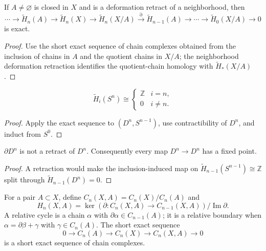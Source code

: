 \begin{theorem}
\label{thm:excision}

If $A\ne\varnothing$ is closed in $X$ and is a deformation retract of a neighborhood, then
\[
\cdots\to\widetilde H_n(A)\to\widetilde H_n(X)\to\widetilde H_n(X/A)\xrightarrow{\partial}\widetilde H_{n-1}(A)\to\cdots\to\widetilde H_0(X/A)\to0
\]
is exact.
\end{theorem}
\begin{proof}
\sketch Use the short exact sequence of chain complexes obtained from the inclusion of chains in $A$ and the quotient chains in $X/A$; the neighborhood deformation retraction identifies the quotient-chain homology with $\widetilde H_*(X/A)$.
\end{proof}

\begin{corollary}
\label{cor:homology-spheres}

\[
\widetilde H_i(S^n)\cong\begin{cases}\mathbb{Z}&i=n,\\0&i\ne n.\end{cases}
\]
\end{corollary}
\begin{proof}
\sketch Apply the exact sequence to $(D^n,S^{n-1})$, use contractibility of $D^n$, and induct from $S^0$.
\end{proof}

\begin{corollary}
\label{cor:non-retraction-disk-boundary}

$\partial D^n$ is not a retract of $D^n$.  Consequently every map $D^n\to D^n$ has a fixed point.
\end{corollary}
\begin{proof}
\sketch A retraction would make the inclusion-induced map on $\widetilde H_{n-1}(S^{n-1})\cong\mathbb{Z}$ split through $\widetilde H_{n-1}(D^n)=0$.
\end{proof}

For a pair $A\subset X$, define $C_n(X,A)=C_n(X)/C_n(A)$ and
\[
H_n(X,A)=\ker(\partial:C_n(X,A)\to C_{n-1}(X,A))/\operatorname{Im}\partial.
\]
A relative cycle is a chain $\alpha$ with $\partial\alpha\in C_{n-1}(A)$; it is a relative boundary when $\alpha=\partial\beta+\gamma$ with $\gamma\in C_n(A)$.  The short exact sequence
\[
0\to C_n(A)\to C_n(X)\to C_n(X,A)\to0
\]
is a short exact sequence of chain complexes.

